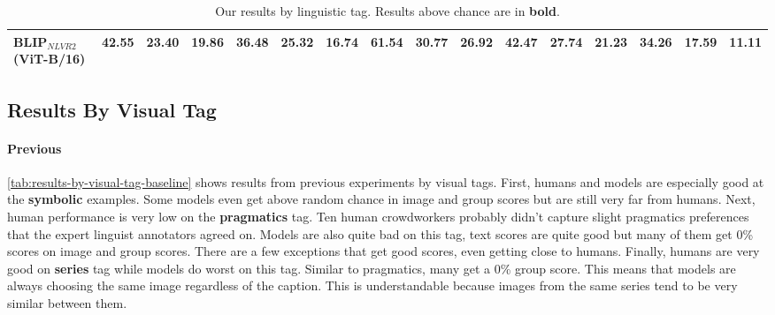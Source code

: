 \begin{table}[ht]
\begin{adjustbox}{max width=\textwidth}
\begin{tabular}{l|rrr|rrr|rrr|rrr|rrr}
 BLIP$_{NLVR2}$ (ViT-B/16)           & \textbf{42.55} & 23.40          & \textbf{19.86} & \textbf{36.48} & \textbf{25.32} & \textbf{16.74} & \textbf{61.54} & \textbf{30.77} & \textbf{26.92} & \textbf{42.47} & \textbf{27.74} & \textbf{21.23} & \textbf{34.26} & 17.59          & 11.11          \\
          \bottomrule
  \end{tabular}
  \end{adjustbox}
  \caption{Our results by linguistic tag. Results above chance are in \textbf{bold}.}
    \label{tab:results-by-ling-tag-ours}
\end{table}

\subsection{Results By Visual Tag} \label{winoground_results_visual}

\paragraph{Previous}

\cref{tab:results-by-visual-tag-baseline} shows results from previous experiments \cite{thrush2022winoground} by visual tags. First, humans and models are especially good at the \textbf{symbolic} examples. Some models even get above random chance in image and group scores but are still very far from humans. Next, human performance is very low on the \textbf{pragmatics} tag. Ten human crowdworkers probably didn't capture slight pragmatics preferences that the expert linguist annotators agreed on. Models are also quite bad on this tag, text scores are quite good but many of them get 0\% scores on image and group scores. There are a few exceptions that get good scores, even getting close to humans. Finally, humans are very good on \textbf{series} tag while models do worst on this tag. Similar to pragmatics, many get a 0\% group score. This means that models are always choosing the same image regardless of the caption. This is understandable because images from the same series tend to be very similar between them.

